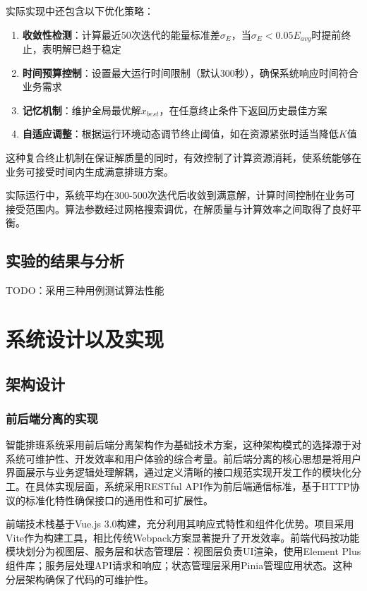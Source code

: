\documentclass{ctexart}
\begin{document}
实际实现中还包含以下优化策略：
\begin{enumerate}
    \item \textbf{收敛性检测}：计算最近50次迭代的能量标准差$\sigma_E$，当$\sigma_E < 0.05E_{avg}$时提前终止，表明解已趋于稳定
    \item \textbf{时间预算控制}：设置最大运行时间限制（默认300秒），确保系统响应时间符合业务需求
    \item \textbf{记忆机制}：维护全局最优解$x_{best}$，在任意终止条件下返回历史最佳方案
    \item \textbf{自适应调整}：根据运行环境动态调节终止阈值，如在资源紧张时适当降低$K$值
\end{enumerate}

这种复合终止机制在保证解质量的同时，有效控制了计算资源消耗，使系统能够在业务可接受时间内生成满意排班方案。

实际运行中，系统平均在300-500次迭代后收敛到满意解，计算时间控制在业务可接受范围内。算法参数经过网格搜索调优，在解质量与计算效率之间取得了良好平衡。

\subsection{实验的结果与分析}
TODO：采用三种用例测试算法性能


\section{系统设计以及实现}
\subsection{架构设计}
\subsubsection{前后端分离的实现}
智能排班系统采用前后端分离架构作为基础技术方案，这种架构模式的选择源于对系统可维护性、开发效率和用户体验的综合考量。前后端分离的核心思想是将用户界面展示与业务逻辑处理解耦，通过定义清晰的接口规范实现开发工作的模块化分工。在具体实现层面，系统采用RESTful API作为前后端通信标准，基于HTTP协议的标准化特性确保接口的通用性和可扩展性。

前端技术栈基于Vue.js 3.0构建，充分利用其响应式特性和组件化优势。项目采用Vite作为构建工具，相比传统Webpack方案显著提升了开发效率。前端代码按功能模块划分为视图层、服务层和状态管理层：视图层负责UI渲染，使用Element Plus组件库；服务层处理API请求和响应；状态管理层采用Pinia管理应用状态。这种分层架构确保了代码的可维护性。
\end{document}
